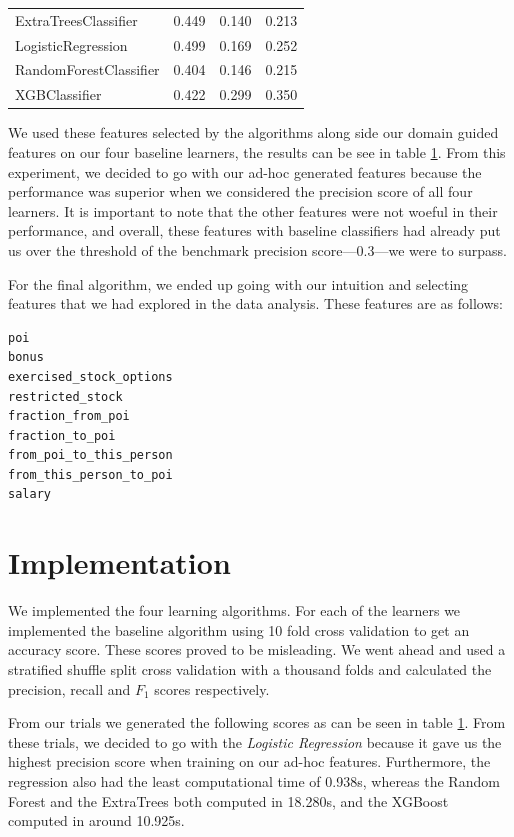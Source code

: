 \documentclass[twoside,openright,titlepage,numbers=noenddot,headinclude,%
               footinclude=true,cleardoublepage=empty,abstractoff,BCOR=5mm,%
               paper=a4,fontsize=11pt,ngerman,american]{scrreprt}
\numberwithin{theorem}{chapter}
\numberwithin{definition}{chapter}
\numberwithin{algorithm}{chapter}
\numberwithin{figure}{chapter}
\numberwithin{table}{chapter}
\numberwithin{equation}{chapter}
\begin{document}
\begin{table}[!htbp]
\begin{tabular}{|p{6cm}|p{1.5cm}|p{1.5cm}|p{1.5cm}|}
ExtraTreesClassifier     &  0.449       &  0.140     &  0.213     \\ 
LogisticRegression       &  0.499       &  0.169     &  0.252     \\ 
RandomForestClassifier   &  0.404       &  0.146     &  0.215     \\ 
XGBClassifier            &  0.422       &  0.299     &  0.350     \\ 

\hline %

\end{tabular}
\label{benchMarkScoresTable}
\end{table}

We used these features selected by the algorithms along side our domain guided features on our four baseline learners, the results can be see in table \ref{benchMarkScoresTable}. From this experiment, we decided to go with our ad-hoc generated features because the performance was superior when we considered the precision score of all four learners. It is important to note that the other features were not woeful in their performance, and overall, these features with baseline classifiers had already put us over the threshold of the benchmark precision score---0.3---we were to surpass.

For the final algorithm, we ended up going with our intuition and selecting features that we had explored in the data analysis. These features are as follows: 
\begin{verbatim}
poi
bonus
exercised_stock_options
restricted_stock
fraction_from_poi
fraction_to_poi
from_poi_to_this_person
from_this_person_to_poi
salary
\end{verbatim}


\section*{Implementation}

We implemented the four learning algorithms. For each of the learners we implemented the baseline algorithm using 10 fold cross validation to get an accuracy score. These scores proved to be misleading. We went ahead and used a stratified shuffle split cross validation with a thousand folds and calculated the precision, recall and $F_1$ scores respectively.

From our trials we generated the following scores as can be seen in table \ref{benchMarkScoresTable}. From these trials, we decided to go with the \textit{Logistic Regression} because it gave us the highest precision score when training on our ad-hoc features. Furthermore, the regression also had the least computational time of 0.938s, whereas the Random Forest and the ExtraTrees both computed in 18.280s, and the XGBoost computed in around 10.925s.
\end{document}
